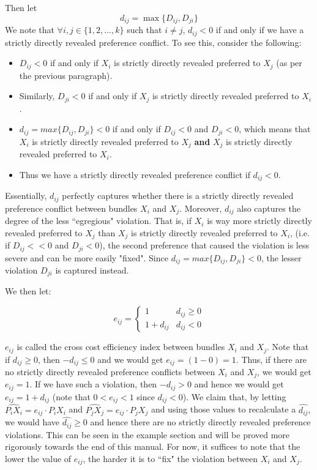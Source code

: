 \documentclass{article} %
\begin{document}
Then let
$$d_{ij}=\max\{D_{ij}, D_{ji}\}$$ 
We note that $\forall i,j\in\{1,2,\ldots,k\}$ such that $i\not=j$, $d_{ij}<0$ if and only if we have a strictly directly revealed preference conflict. To see this, consider the following:

\begin{itemize}
    \item $D_{ij}<0$ if and only if $X_{i}$ is strictly directly revealed preferred to $X_{j}$ (as per the previous paragraph). 
    \item Similarly, $D_{ji}<0$ if and only if $X_{j}$ is strictly directly revealed preferred to $X_{i}$.
    \item $d_{ij}=max\{D_{ij}, D_{ji}\}<0$ if and only if $D_{ij}<0$ and $D_{ji}<0$, which means that $X_{i}$ is strictly directly revealed preferred to $X_{j}$ \textbf{and} $X_{j}$ is strictly directly revealed preferred to $X_{i}$. 
    \item Thus we have a strictly directly revealed preference conflict if $d_{ij} < 0$.
\end{itemize}

Essentially, $d_{ij}$ perfectly captures whether there is a strictly directly revealed preference conflict between bundles $X_{i}$ and $X_{j}$. Moreover, $d_{ij}$ also captures the degree of the less ``egregious" violation. That is, if $X_{i}$ is way more strictly directly revealed preferred to $X_{j}$ than $X_{j}$ is strictly directly revealed preferred to $X_{i}$, (i.e. if $D_{ij}<<0$ and $D_{ji}<0$), the second preference that caused the violation is less severe and can be more easily "fixed". Since $d_{ij}=max\{D_{ij}, D_{ji}\}<0$, the lesser violation $D_{ji}$ is captured instead.

We then let:

\[
e_{ij}=
\begin{cases}
1 & d_{ij}\geq0 \\
1+d_{ij} & d_{ij}<0
\end{cases}
\]

$e_{ij}$ is called the cross cost efficiency index between bundles $X_{i}$ and $X_{j}$. Note that if $d_{ij}\geq0$, then $-d_{ij}\leq0$ and we would get $e_{ij}=(1-0)=1$. Thus, if there are no strictly directly revealed preference conflicts between $X_{i}$ and $X_{j}$, we would get $e_{ij}=1$. If we have such a violation, then $-d_{ij}>0$ and hence we would get $e_{ij}=1+d_{ij}$ (note that $0<e_{ij}<1$ since $d_{ij}<0$). We claim that, by letting $\hat{ P_iX_i}=e_{ij}\cdot P_iX_i$ and $\hat{P_jX_j}=e_{ij}\cdot P_jX_j$ and using those values to recalculate a $\hat{d_{ij}}$, we would have $\hat{d_{ij}}\geq0$ and hence there are no strictly directly revealed preference violations. This can be seen in the example section and will be proved more rigorously towards the end of this manual. For now, it suffices to note that the lower the value of $e_{ij}$, the harder it is to ``fix" the violation between $X_{i}$ and $X_{j}$.
\end{document}
